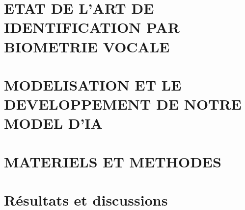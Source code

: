 \documentclass{ifri}
\begin{document}
\pageDeGarde

\pagecolor{white}





\setcounter{tocdepth}{0}
\setcounter{tocdepth}{5}


\newpage 


\newpage 


\newpage

\listoffigures 
\newpage


\listofalgorithmes
\newpage

\printglossary[title=Liste des acronymes, toctitle=Liste des acronymes, type=\acronymtype]
\newpage



\setcounter{page}{1}

\fancyhead[L]{\tiny \leftmark}
\fancyhead[R]{\scriptsize \rightmark}
\fancyfoot[C]{\thepage}

\chapter{ETAT DE L’ART DE IDENTIFICATION PAR BIOMETRIE VOCALE}\label{chap:1}
 
 
 \chapter{MODELISATION ET LE DEVELOPPEMENT DE NOTRE MODEL D’IA}\label{chap:2}
 
 
\chapter{MATERIELS ET METHODES}\label{chap:3}
 

 \chapter{Résultats et discussions}\label{chap:4}
 

% 

% 
\lhead[]{} \rhead[]{} \chead[]{}





%

\newpage
\tableofcontents
\end{document}
